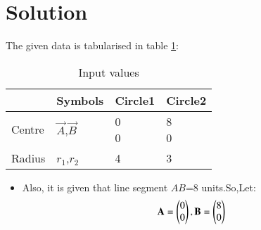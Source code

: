 \documentclass[journal,12pt,twocolumn]{IEEEtran}
\begin{document}
\section{Solution}
The given data is tabularised in table \ref{tab:table1}:
\begin{table}[!ht]
\begin{center}
\begin{tabular}{ | m{2cm} | m{1.5cm}| m{2cm} | m{1.5cm} |} 
\hline
 & Symbols & Circle1 & Circle2 \\
\hline
Centre & $\vec{A}$,$\vec{B}$ & \myvec{0\\0} & \myvec{8\\0} \\ 
\hline
Radius & $r_{1}$,$r_{2}$ & 4 & 3 \\ 
\hline
\end{tabular}
\end{center}
\caption{Input values}
\label{tab:table1}
\end{table}
\begin{itemize}
    \item Also, it is given that line segment $AB$=8 units.So,Let:
\begin{align}
\mathbf{A}=\begin{pmatrix}0\\0\end{pmatrix} ,\mathbf{B}=\begin{pmatrix}8\\0\end{pmatrix}    
\end{align} 
\end{itemize}
\end{document}
